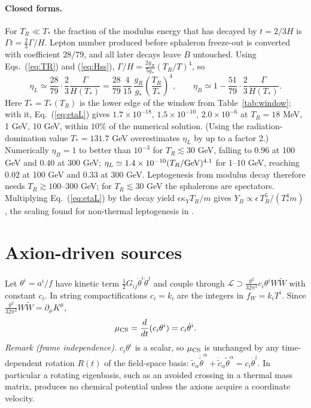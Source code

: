 \documentclass[11pt]{article}
\begin{document}
\paragraph*{Closed forms.} For $T_R\ll T_*$ the fraction of the modulus energy that has decayed by $t=2/3H$ is $\Gamma t=\tfrac23\Gamma/H$. Lepton number produced before sphaleron freeze-out is converted with coefficient $28/79$, and all later decays leave $B$ untouched. Using Eqs.~(\ref{eq:TR}) and (\ref{eq:Hss}), $\Gamma/H=\tfrac{2g_R}{5g_*}(T_R/T)^4$, so
\begin{equation}
\eta_L\simeq\frac{28}{79}\cdot\frac23\frac{\Gamma}{H(T_*)}=\frac{28}{79}\,\frac{4}{15}\,\frac{g_R}{g_*}\left(\frac{T_R}{T_*}\right)^4,\qquad
\eta_B\simeq1-\frac{51}{79}\cdot\frac23\frac{\Gamma}{H(T_*)}.
\label{eq:etaL}
\end{equation}
Here $T_*=T_*(T_R)$ is the lower edge of the window from Table~\ref{tab:window}; with it, Eq.~(\ref{eq:etaL}) gives $1.7\times10^{-18}$, $1.5\times10^{-10}$, $2.0\times10^{-6}$ at $T_R=18$ MeV, 1 GeV, 10 GeV, within $10\%$ of the numerical solution. (Using the radiation-domination value $T_*=131.7$ GeV overestimates $\eta_L$ by up to a factor 2.) Numerically $\eta_B=1$ to better than $10^{-3}$ for $T_R\lesssim30$ GeV, falling to $0.96$ at 100 GeV and $0.40$ at 300 GeV; $\eta_L\simeq1.4\times10^{-10}(T_R/{\rm GeV})^{4.1}$ for 1--10 GeV, reaching $0.02$ at 100 GeV and $0.33$ at 300 GeV. Leptogenesis from modulus decay therefore needs $T_R\gtrsim100$--$300$ GeV; for $T_R\lesssim30$ GeV the sphalerons are spectators. Multiplying Eq.~(\ref{eq:etaL}) by the decay yield $\epsilon\kappa_YT_R/m$ gives $Y_B\propto\epsilon\,T_R^5/(T_*^4m)$, the scaling found for non-thermal leptogenesis in \cite{Garcia}.

\section{Axion-driven sources}\label{sec:axion}

Let $\theta^i=a^i/f$ have kinetic term $\tfrac12G_{ij}\dot\theta^i\dot\theta^j$ and couple through $\mathcal L\supset\frac{g^2}{32\pi^2}c_i\theta^iW\tilde W$ with constant $c_i$. In string compactifications $c_i=k_i$ are the integers in $f_W=k_iT^i$. Since $\frac{g^2}{32\pi^2}W\tilde W=\partial_\mu K^\mu$,
\begin{equation}
\mu_{\rm CS}=\frac{d}{dt}(c_i\theta^i)=c_i\dot\theta^i.
\end{equation}
\emph{Remark (frame independence).} $c_i\theta^i$ is a scalar, so $\mu_{\rm CS}$ is unchanged by any time-dependent rotation $R(t)$ of the field-space basis: $\tilde c_\alpha\dot{\tilde\theta}^\alpha+\dot{\tilde c}_\alpha\tilde\theta^\alpha=c_i\dot\theta^i$. In particular a rotating eigenbasis, such as an avoided crossing in a thermal mass matrix, produces no chemical potential unless the axions acquire a coordinate velocity.
\end{document}

